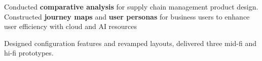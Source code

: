       \vspace{-1.0mm}
      \resumeItemListStart
      \item Conducted \textbf{comparative analysis} for supply chain management product design. Constructed \textbf{journey maps} and \textbf{user personas} for business users to enhance user efficiency with cloud and AI resources
      \item Designed configuration features and revamped layouts, delivered three mid-fi and hi-fi prototypes.
    \resumeItemListEnd
    \vspace{-3mm}
  \resumeSubHeadingListEnd
\vspace{-5.5mm}
